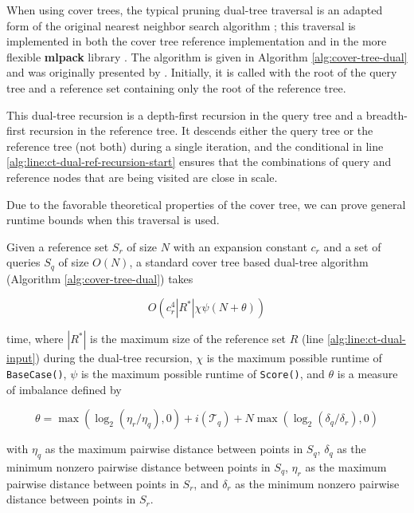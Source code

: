 When using cover trees, the typical pruning dual-tree traversal is an adapted
form of the original nearest neighbor search algorithm \citep[see
\texttt{Find-All-Nearest},][]{langford2006}; this traversal is implemented in
both the cover tree reference implementation and in the more flexible {\bf
mlpack} library \citep{mlpack2013}.  The algorithm is given in Algorithm
\ref{alg:cover-tree-dual} and was originally presented by
\citet{curtin2014dual}.  Initially, it is called with the root of the query tree
and a reference set containing only the root of the reference tree.

This dual-tree recursion is a depth-first recursion in the query tree and a
breadth-first recursion in the reference tree.  It descends either the query
tree or the reference tree (not both) during a single iteration, and the
conditional in line \ref{alg:line:ct-dual-ref-recursion-start} ensures that the
combinations of query and reference nodes that are being visited are close in
scale.

Due to the favorable theoretical properties of the cover tree, we can prove
general runtime bounds when this traversal is used.

\begin{thm}
\label{thm:ct-runtime}
Given a reference set $S_r$ of size $N$ with an expansion constant $c_r$ and a
set of queries $S_q$ of size $O(N)$, a standard cover tree based dual-tree
algorithm (Algorithm \ref{alg:cover-tree-dual}) takes

\begin{equation}
O\left(c_r^4 | R^* | \chi \psi (N + \theta)\right)
\end{equation}

\noindent time, where $ | R^* | $ is the maximum size of the reference set $R$
(line \ref{alg:line:ct-dual-input}) during the dual-tree recursion, $\chi$ is
the maximum possible runtime of \texttt{BaseCase()}, $\psi$ is the maximum
possible runtime of \texttt{Score()}, and $\theta$ is a measure of imbalance
defined by

\begin{equation}
\theta = \max(\log_2(\eta_r / \eta_q), 0) + i(\mathscr{T}_q) + N
\max(\log_2(\delta_q / \delta_r), 0)
\end{equation}

\noindent with $\eta_q$ as the maximum pairwise distance between points in
$S_q$, $\delta_q$ as the minimum nonzero pairwise distance between points in
$S_q$, $\eta_r$ as the maximum pairwise distance between points in $S_r$, and
$\delta_r$ as the minimum nonzero pairwise distance between points in $S_r$.
\end{thm}

